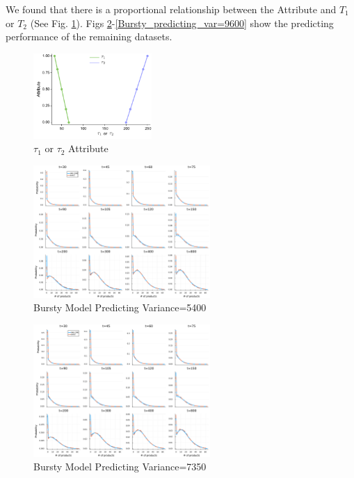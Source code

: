 \documentclass[a4paper,10pt]{article}
\begin{document}
We found that there is a proportional relationship between the Attribute and $T_1$ or $T_2$ (See Fig. \ref{T1orT2_Attribute}). Figs \ref{Bursty_predicting_var=5400}-\ref{Bursty_predicting_var=9600} show the predicting performance of the remaining datasets.
\begin{figure}[h]
	\centering
	\includegraphics[width=0.4\textwidth]{Figs/T1orT2_Attribute.pdf}
	\caption{$\tau_1$ or $\tau_2$ Attribute}\label{T1orT2_Attribute}  
\end{figure}
\begin{figure}[h]
	\centering
	\includegraphics[width=0.6\textwidth]{Figs/predict_var=5400.pdf}
	\caption{Bursty Model Predicting Variance=5400}\label{Bursty_predicting_var=5400}  
\end{figure}
\begin{figure}[h]
	\centering
	\includegraphics[width=0.6\textwidth]{Figs/predict_var=7350.pdf}
	\caption{Bursty Model Predicting Variance=7350}\label{Bursty_predicting_var=7350}  
\end{figure}
\end{document}
